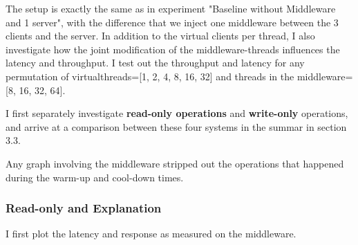 \documentclass[11pt,a4paper]{article}
\begin{document}
The setup is exactly the same as in experiment "Baseline without Middleware and 1 server", with the difference that we inject one middleware between the 3 clients and the server.
In addition to the virtual clients per thread, I also investigate how the joint modification of the middleware-threads influences the latency and throughput.
I test out the throughput and latency for any permutation of
virtualthreads=[1, 2, 4, 8, 16, 32] and threads in the middleware=[8, 16, 32, 64].

I first separately investigate \textbf{read-only operations} and \textbf{write-only} operations, and arrive at a comparison between these four systems in the summar in section 3.3.

Any graph involving the middleware stripped out the operations that happened during the warm-up and cool-down times.

\subsubsection{Read-only and Explanation}

I first plot the latency and response as measured on the middleware.
\end{document}
